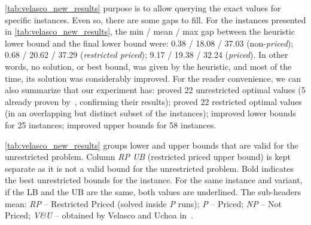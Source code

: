 \documentclass[smallextended]{svjour3}       %
\begin{document}
\autoref{tab:velasco_new_results} purpose is to allow querying the exact values for specific instances.
Even so, there are some gaps to fill.
For the instances presented in \autoref{tab:velasco_new_results},
the min / mean / max gap between the heuristic lower bound and the final lower bound were: 0.38 / 18.08 / 37.03 (non-\emph{priced}); 0.68 / 20.62 / 37.29 (\emph{restricted priced}); 9.17 / 19.38 / 32.24 (\emph{priced}).
In other words, no solution, or best bound, was given by the heuristic, and most of the time, its solution was considerably improved.
For the reader convenience, we can also summarize that our experiment has:
proved 22 unrestricted optimal values (5 already proven by~\cite{velasco:2019}, confirming their results);
proved 22 restricted optimal values (in an overlapping but distinct subset of the instances);
improved lower bounds for 25 instances;
improved upper bounds for 58 instances.

\autoref{tab:velasco_new_results} groups lower and upper bounds that are valid for the unrestricted problem.
Column \emph{RP UB} (restricted priced upper bound) is kept separate as it is not a valid bound for the unrestricted problem.
Bold indicates the best unrestricted bounds for the instance.
For the same instance and variant, if the LB and the UB are the same, both values are underlined.
The sub-headers mean:
\emph{RP} -- Restricted Priced (solved inside \emph{P} runs);
\emph{P} -- Priced;
\emph{NP} -- Not Priced;
\emph{V\&U} -- obtained by Velasco and Uchoa in~\cite{velasco:2019}.
\end{document}
